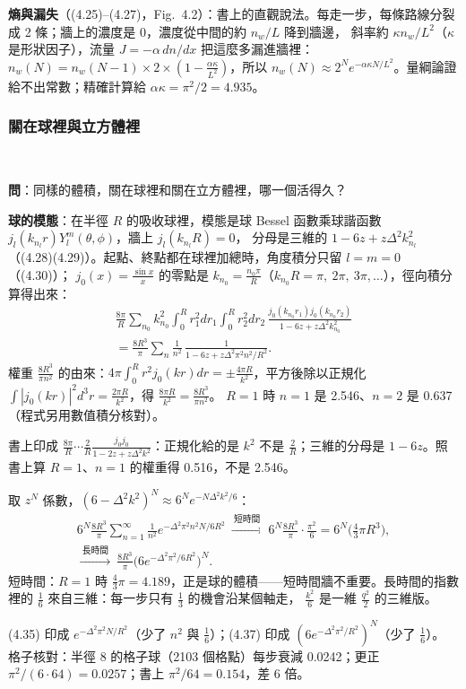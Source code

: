 \textbf{熵與漏失}（(4.25)--(4.27)，Fig.~4.2）：書上的直觀說法。每走一步，每條路線分裂成 2 條；牆上的濃度是 0，濃度從中間的約 $n_w/L$ 降到牆邊，
斜率約 $\kappa n_w/L^2$（$\kappa$ 是形狀因子），流量 $J=-\alpha\,dn/dx$ 把這麼多漏進牆裡：
$n_w(N)=n_w(N-1)\times2\times(1-\frac{\alpha\kappa}{L^2})$，所以 $n_w(N)\approx2^Ne^{-\alpha\kappa N/L^2}$。量綱論證給不出常數；精確計算給 $\alpha\kappa=\pi^2/2=4.935$。

\subsubsection{關在球裡與立方體裡}
\ 

\textbf{問}：同樣的體積，關在球裡和關在立方體裡，哪一個活得久？

\textbf{球的模態}：在半徑 $R$ 的吸收球裡，模態是球 Bessel 函數乘球諧函數 $j_l(k_{n_l}r)Y_l^m(\theta,\phi)$，牆上 $j_l(k_{n_l}R)=0$，
分母是三維的 $1-6z+z\Delta^2k_{n_l}^2$（(4.28)(4.29)）。起點、終點都在球裡加總時，角度積分只留 $l=m=0$（(4.30)）；
$j_0(x)=\frac{\sin x}{x}$ 的零點是 $k_{n_0}=\frac{n_0\pi}{R}$（$k_{n_0}R=\pi,\ 2\pi,\ 3\pi,\dots$），徑向積分算得出來：
\begin{gather*}
\frac{8\pi}{R}\sum_{n_0}k_{n_0}^2\int_0^Rr_1^2dr_1\int_0^Rr_2^2dr_2\,\frac{j_0(k_{n_0}r_1)j_0(k_{n_0}r_2)}{1-6z+z\Delta^2k_{n_0}^2}\tag{4.31}\\
=\frac{8R^3}{\pi}\sum_n\frac1{n^2}\,\frac1{1-6z+z\Delta^2\pi^2n^2/R^2}.\tag{4.32--4.34}
\end{gather*}
權重 $\frac{8R^3}{\pi n^2}$ 的由來：$4\pi\int_0^Rr^2j_0(kr)dr=\pm\frac{4\pi R}{k^2}$，平方後除以正規化 $\int|j_0(kr)|^2d^3r=\frac{2\pi R}{k^2}$，得 $\frac{8\pi R}{k^2}=\frac{8R^3}{\pi n^2}$。
$R=1$ 時 $n=1$ 是 2.546、$n=2$ 是 0.637（程式另用數值積分核對）。
\begin{errbox}[p.~80，(4.31)]
書上印成 $\frac{8\pi}{R}\cdots\frac{2}{R}\frac{j_0j_0}{1-2z+z\Delta^2k^2}$：正規化給的是 $k^2$ 不是 $\frac2R$；三維的分母是 $1-6z$。照書上算 $R=1$、$n=1$ 的權重得 0.516，不是 2.546。
\end{errbox}

取 $z^N$ 係數，$(6-\Delta^2k^2)^N\approx6^Ne^{-N\Delta^2k^2/6}$：
\begin{gather*}
6^N\frac{8R^3}{\pi}\sum_{n=1}^\infty\frac1{n^2}e^{-\Delta^2\pi^2n^2N/6R^2}\ \xrightarrow{\ \text{短時間}\ }\ 6^N\frac{8R^3}{\pi}\cdot\frac{\pi^2}6=6^N\Big(\frac43\pi R^3\Big),\\
\xrightarrow{\ \text{長時間}\ }\ \frac{8R^3}{\pi}\Big(6e^{-\Delta^2\pi^2/6R^2}\Big)^N.\tag{4.35--4.37}
\end{gather*}
短時間：$R=1$ 時 $\frac43\pi=4.189$，正是球的體積——短時間牆不重要。長時間的指數裡的 $\frac16$ 來自三維：每一步只有 $\frac13$ 的機會沿某個軸走，
$\frac{k^2}{6}$ 是一維 $\frac{q^2}{2}$ 的三維版。
\begin{errbox}[p.~81，(4.35)(4.37)]
(4.35) 印成 $e^{-\Delta^2\pi^2N/R^2}$（少了 $n^2$ 與 $\frac16$）；(4.37) 印成 $(6e^{-\Delta^2\pi^2/R^2})^N$（少了 $\frac16$）。
格子核對：半徑 8 的格子球（2103 個格點）每步衰減 0.0242；更正 $\pi^2/(6\cdot64)=0.0257$；書上 $\pi^2/64=0.154$，差 6 倍。
\end{errbox}

